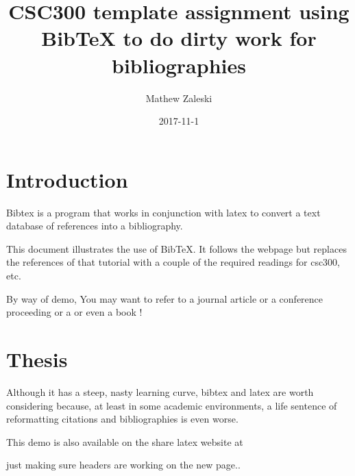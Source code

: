 \documentclass{article}
\begin{document}
\title{CSC300 template assignment using BibTeX to do dirty work for bibliographies}
\author{Mathew Zaleski}
\date{2017-11-1}

\maketitle
\thispagestyle{fancy}
\section{Introduction}

Bibtex \cite{original-bibtex,bibtex} is a program that works in
conjunction with latex to convert
a text database of references into a bibliography. 

This document illustrates the use of BibTeX\@.  It follows  the webpage
\cite{bibtex-tutorial}  but replaces the references of that tutorial
with a couple of the required readings for csc300, etc. 

By way of demo, You may want to refer to a journal article \cite{warren-brandeis-1890}
or a conference proceeding \cite{siva05} or a \cite{gosling-interview}
or even a book \cite {java-jvm-spec}!

\section{Thesis}

Although it has a steep, nasty learning curve, bibtex and latex are
worth considering because, at least in some academic environments, a
life sentence of reformatting citations and bibliographies is even
worse.

This demo is also available on the share latex website at \cite{shared-latex-page}
\newpage

just making sure headers are working on the new page..




\end{document}
